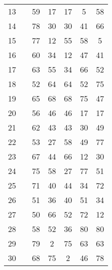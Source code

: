 \begin{apendicesenv}
\begin{center}
\begin{landscape}
\begin{longtable}{@{\extracolsep{\fill}}ccccccc@{}}
            13      &  & 59   & 17      & 17      & 5       & 58     \\
            14      &  & 78   & 30      & 30      & 41      & 66     \\
            15      &  & 77   & 12      & 55      & 58      & 5      \\
            16      &  & 60   & 34      & 12      & 47      & 41     \\
            17      &  & 63   & 55      & 34      & 66      & 52     \\
            18      &  & 52   & 64      & 64      & 52      & 75     \\
            19      &  & 65   & 68      & 68      & 75      & 47     \\
            20      &  & 56   & 46      & 46      & 17      & 17     \\
            21      &  & 62   & 43      & 43      & 30      & 49     \\
            22      &  & 53   & 27      & 58      & 49      & 77     \\
            23      &  & 67   & 44      & 66      & 12      & 30     \\
            24      &  & 75   & 58      & 27      & 77      & 51     \\
            25      &  & 71   & 40      & 44      & 34      & 72     \\
            26      &  & 51   & 36      & 40      & 51      & 34     \\
            27      &  & 50   & 66      & 52      & 72      & 12     \\
            28      &  & 58   & 52      & 36      & 80      & 80     \\
            29      &  & 79   & 2       & 75      & 63      & 63     \\
            30      &  & 68   & 75      & 2       & 46      & 78     \\
            \hline
        \end{longtable}
    \end{landscape}
\end{center}
\normalsize



\end{apendicesenv}
